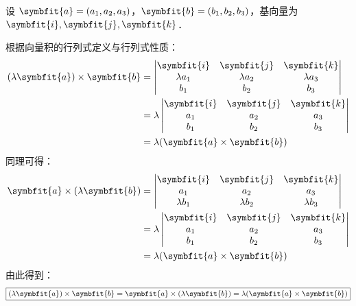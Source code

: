 \begin{myproof}
    设 $\symbfit{a} = (a_1, a_2, a_3)$，$\symbfit{b} = (b_1, b_2, b_3)$，基向量为 $\symbfit{i}, \symbfit{j}, \symbfit{k}$．


    根据向量积的行列式定义与行列式性质：
    \begin{equation}
        \begin{aligned}
            (\lambda\symbfit{a}) \times \symbfit{b} & = \begin{vmatrix} \symbfit{i} & \symbfit{j} & \symbfit{k} \\ \lambda a_1 & \lambda a_2 & \lambda a_3 \\ b_1 & b_2 & b_3 \end{vmatrix} \\
                                                    & = \lambda \begin{vmatrix} \symbfit{i} & \symbfit{j} & \symbfit{k} \\ a_1 & a_2 & a_3 \\ b_1 & b_2 & b_3 \end{vmatrix}                 \\
                                                    & = \lambda(\symbfit{a} \times \symbfit{b})
        \end{aligned}
    \end{equation}
    同理可得：
    \begin{equation}
        \begin{aligned}
            \symbfit{a} \times (\lambda\symbfit{b}) & = \begin{vmatrix} \symbfit{i} & \symbfit{j} & \symbfit{k} \\ a_1 & a_2 & a_3 \\ \lambda b_1 & \lambda b_2 & \lambda b_3 \end{vmatrix} \\
                                                    & = \lambda \begin{vmatrix} \symbfit{i} & \symbfit{j} & \symbfit{k} \\ a_1 & a_2 & a_3 \\ b_1 & b_2 & b_3 \end{vmatrix}                 \\
                                                    & = \lambda(\symbfit{a} \times \symbfit{b})
        \end{aligned}
    \end{equation}
    由此得到：
    \begin{equation}
        \boxed{(\lambda\symbfit{a}) \times \symbfit{b} = \symbfit{a} \times (\lambda\symbfit{b}) = \lambda(\symbfit{a} \times \symbfit{b})}
    \end{equation}


\end{myproof}

